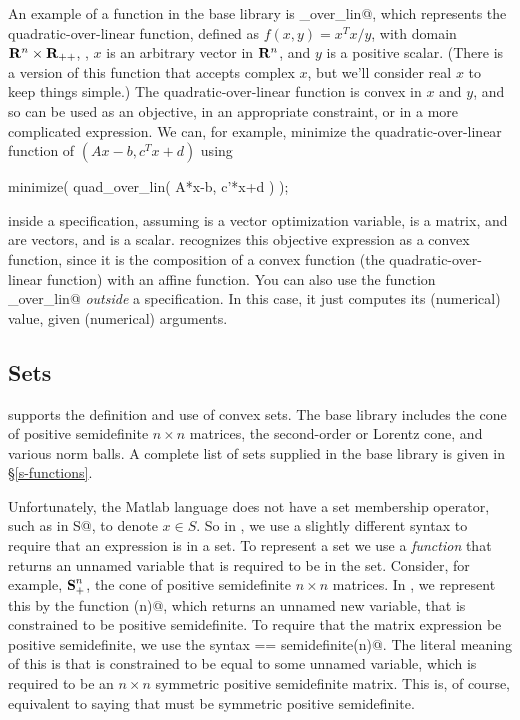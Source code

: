 \documentclass[12pt]{article}
\newcommand{\symm}{{\mbox{\bf S}}}  %
\begin{document}
An example of a function in the base library is
\verb@quad_over_lin@, which represents the
quadratic-over-linear function, defined as $f(x,y)=x^Tx/y$,
with domain $\R^n \times \R_{++}$, \ie,
$x$ is an arbitrary vector in $\R^n$, and $y$ is a positive
scalar.  (There is a version of this function that accepts
complex $x$, but we'll consider real $x$ to keep things simple.)
The quadratic-over-linear function is convex in 
$x$ and $y$, and so can be 
used as an objective, in an appropriate constraint, or in a 
more complicated expression.
We can, for example, minimize the quadratic-over-linear
function of $(Ax-b,c^Tx+d)$ using
\begin{code}
	minimize( quad_over_lin( A*x-b, c'*x+d ) );
\end{code}
inside a \cvx specification,
assuming \verb@x@ is a vector optimization variable,
\verb@A@ is a matrix, \verb@b@
and \verb@c@ are vectors, and \verb@d@ is a scalar.
\cvx recognizes this objective expression as a convex 
function, since it is
the composition of a convex function (the quadratic-over-linear
function) with an affine function.
You can also use the function \verb@quad_over_lin@ \emph{outside}
a \cvx specification.   In this case, it just computes its (numerical)
value, given (numerical) arguments.

\subsection{Sets}
\label{sec:sets}

\cvx supports the definition and use of convex sets.
The base library includes the cone of 
positive semidefinite $n \times n$ matrices,
the second-order or Lorentz cone, and various norm balls.
A complete list of sets supplied in the base library is given in 
\S\ref{s-functions}.

Unfortunately, the Matlab language does not have a 
set membership operator, such as \verb@x in S@, to denote $x \in S$.  
So in \cvx, we use a slightly different syntax to require
that an expression is in a set.
To represent a set we use a \emph{function} that returns
an unnamed variable that is required to be in the set.
Consider, for example, $\symm^n_+$, the cone of 
positive semidefinite $n \times n$ matrices.
In \cvx, we represent this by the function \verb@semidefinite(n)@,
which returns an unnamed new variable, that is constrained to be
positive semidefinite.
To require that the matrix expression \verb@X@ 
be positive semidefinite, we use the syntax \verb@X == semidefinite(n)@.
The literal meaning of this is that \verb@X@ is constrained to be 
equal to some unnamed variable, which is required to be 
an $n \times n$ symmetric positive semidefinite matrix. 
This is, of course, equivalent to saying that \verb@X@ must be
symmetric positive semidefinite.
\end{document}
